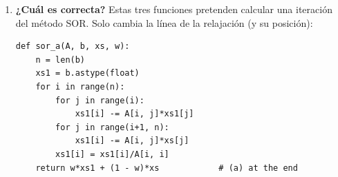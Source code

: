 \begin{enumerate}
\begin{enumerate}
\item Define en Python el sistema (\ref{eq:circuito}). Obtén las intensidades en todas las ramas del circuito empleando una sola función de NumPy. Calcula el número de condición del sistema y di cuántas cifras significativas esperas que sean correctas. Comprueba que se cumple la ley de nodos en los tres nodos.
\item Emplea la factorización QR para obtener de nuevo la solución.
\item El sistema tiene ceros en la diagonal, así que no se le pueden aplicar directamente los métodos iterativos. Reordena sus ecuaciones usando la matriz de permutación de la factorización LU, es decir, usa $P^T\cdot A$ como matriz del sistema y $P^T\cdot b$ como término independiente. Calcula el radio espectral del método de Jacobi e indica si tiene sentido emplear este método.
\item Emplea el método de Jacobi amortiguado con $\omega =0.1$ para calcular las intensidades, con una tolerancia de $10^{-5}$. Antes de ejecutarlo, \emph{predice} a partir del radio espectral el número de iteraciones que necesitará (son más de 3000). Compara la predicción con el resultado y calcula el error real de la solución. ¿Es menor que la tolerancia?
\item Emplea el método SOR con $\omega =0.2$ y la misma tolerancia. Indica el número de iteraciones empleado y discute qué método funciona mejor.
\item Escribe una función que dibuje el radio espectral de la matriz de un método amortiguado en función de $\omega$. Empléala para los métodos de los dos apartados anteriores. ¿Han sido razonables los valores de $\omega$ elegidos?
\end{enumerate}

\item \label{ej:sor_correcta} \textbf{¿Cuál es correcta?} Estas tres funciones pretenden calcular una iteración del método SOR. Solo cambia la línea de la relajación (y su posición):
\begin{verbatim}
def sor_a(A, b, xs, w):
    n = len(b)
    xs1 = b.astype(float)
    for i in range(n):
        for j in range(i):
            xs1[i] -= A[i, j]*xs1[j]
        for j in range(i+1, n):
            xs1[i] -= A[i, j]*xs[j]
        xs1[i] = xs1[i]/A[i, i]
    return w*xs1 + (1 - w)*xs            # (a) at the end


\end{verbatim}
\end{enumerate}
